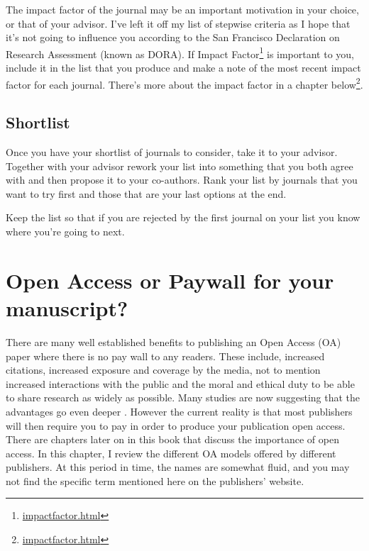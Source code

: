 \documentclass[
]{krantz}
\renewcommand{\href}[2]{#2\footnote{\url{#1}}}
\begin{document}
The impact factor of the journal may be an important motivation in your choice, or that of your advisor. I've left it off my list of stepwise criteria as I hope that it's not going to influence you according to the San Francisco Declaration on Research Assessment (known as DORA). If \href{impactfactor.html}{Impact Factor} is important to you, include it in the list that you produce and make a note of the most recent impact factor for each journal. There's more about the impact factor in a chapter \href{impactfactor.html}{below}.

\hypertarget{shortlist}{%
\section{Shortlist}\label{shortlist}}

Once you have your shortlist of journals to consider, take it to your advisor. Together with your advisor rework your list into something that you both agree with and then propose it to your co-authors. Rank your list by journals that you want to try first and those that are your last options at the end.

Keep the list so that if you are rejected by the first journal on your list you know where you're going to next.

\hypertarget{openaccess1}{%
\chapter{Open Access or Paywall for your manuscript?}\label{openaccess1}}

There are many well established benefits to publishing an Open Access (OA) paper where there is no pay wall to any readers. These include, increased citations, increased exposure and coverage by the media, not to mention increased interactions with the public and the moral and ethical duty to be able to share research as widely as possible. Many studies are now suggesting that the advantages go even deeper \citep[see a collection of studies by][]{tennant2017open}. However the current reality is that most publishers will then require you to pay in order to produce your publication open access. There are chapters later on in this book that discuss the importance of open access. In this chapter, I review the different OA models offered by different publishers. At this period in time, the names are somewhat fluid, and you may not find the specific term mentioned here on the publishers' website.
\end{document}
